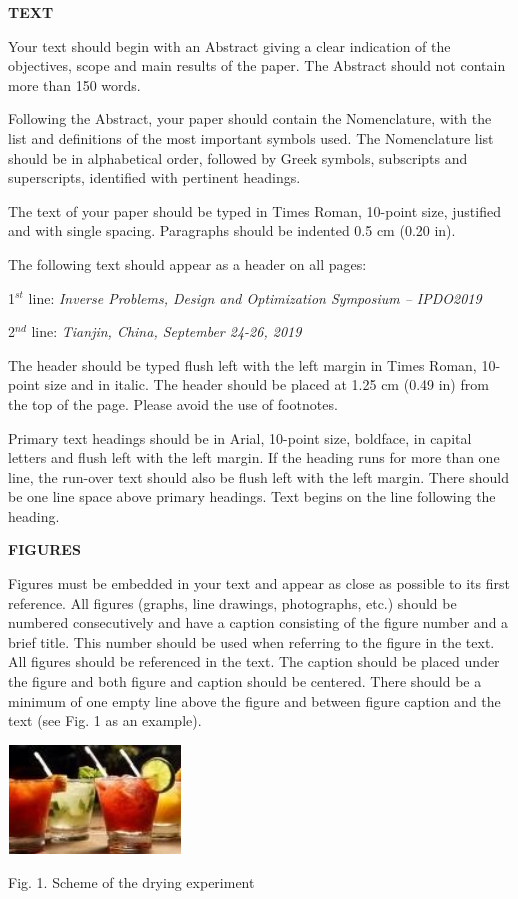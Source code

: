 \documentclass[conference,compsoc]{IEEEtran}
\begin{document}
\textbf{TEXT}

Your text should begin with an Abstract giving a clear indication of the objectives, scope and main results of the paper. The Abstract should not contain more than 150 words.

Following the Abstract, your paper should contain the Nomenclature, with the list and definitions of the most important symbols used. The Nomenclature list should be in alphabetical order, followed by Greek symbols, subscripts and superscripts, identified with pertinent headings.

The text of your paper should be typed in Times Roman, 10-point size, justified and with single spacing. Paragraphs should be indented 0.5 cm (0.20 in).

The following text should appear as a header on all pages:

1$^{st}$ line:\textit{ Inverse Problems, Design and Optimization Symposium -- IPDO2019}

2$^{nd}$ line: \textit{Tianjin, China, September 24-26, 2019}

The header should be typed flush left with the left margin in Times Roman, 10-point size and in italic. The header should be placed at 1.25 cm (0.49 in) from the top of the page. Please avoid the use of footnotes.

Primary text headings should be in Arial, 10-point size, boldface, in capital letters and flush left with the left margin. If the heading runs for more than one line, the run-over text should also be flush left with the left margin. There should be one line space above primary headings. Text begins on the line following the heading.


\textbf{FIGURES}

Figures must be embedded in your text and appear as close as possible to its first reference. All figures (graphs, line drawings, photographs, etc.) should be numbered consecutively and have a caption consisting of the figure number and a brief title. This number should be used when referring to the figure in the text. All figures should be referenced in the text. The caption should be placed under the figure and both figure and caption should be centered. There should be a minimum of one empty line above the figure and between figure caption and the text (see Fig. 1 as an example).
\begin{center}
\includegraphics[width=130pt, height=82pt, keepaspectratio=true]{f1.jpg}

Fig. 1. Scheme of the drying experiment
\end{center}
\end{document}
